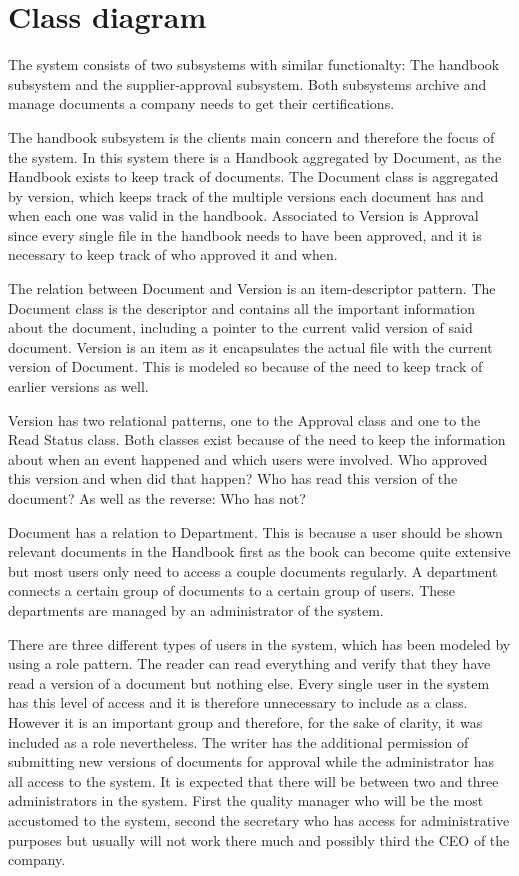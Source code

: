 \section{Class diagram}


The system consists of two subsystems with similar functionalty: 
The handbook subsystem and the supplier-approval subsystem.
Both subsystems archive and manage documents a company needs to get their certifications. 

The handbook subsystem is the clients main concern and therefore the focus of the system. In this system there is a Handbook aggregated by Document, as the Handbook exists to keep track of documents. The Document class is aggregated by version, which keeps track of the multiple versions each document has and when each one was valid in the handbook. Associated to Version is Approval since every single file in the handbook needs to have been approved, and it is necessary to keep track of who approved it and when.

The relation between Document and Version is an item-descriptor pattern. The Document class is the descriptor and contains all the important information about the document, including a pointer to the current valid version of said document. Version is an item as it encapsulates the actual file with the current version of Document. This is modeled so because of the need to keep track of earlier versions as well.

Version has two relational patterns, one to the Approval class and one to the Read Status class. Both classes exist because of the need to keep the information about when an event happened and which users were involved. Who approved this version and when did that happen? Who has read this version of the document? As well as the reverse: Who has not?

Document has a relation to Department. This is because a user should be shown relevant documents in the Handbook first as the book can become quite extensive but most users only need to access a couple documents regularly. A department connects a certain group of documents to a certain group of users. These departments are managed by an administrator of the system.

There are three different types of users in the system, which has been modeled by using a role pattern. The reader can read everything and verify that they have read a version of a document but nothing else. Every single user in the system has this level of access and it is therefore unnecessary to include as a class. However it is an important group and therefore, for the sake of clarity, it was included as a role nevertheless. The writer has the additional permission of submitting new versions of documents for approval while the administrator has all access to the system. It is expected that there will be between two and three administrators in the system. First the quality manager who will be the most accustomed to the system, second the secretary who has access for administrative purposes but usually will not work there much and possibly third the CEO of the company.

